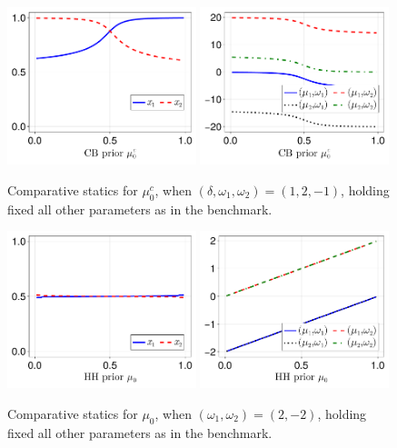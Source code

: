 \documentclass[12pt,a4paper]{article}
\begin{document}
\begin{figure}[H]
\centering
\includegraphics[width=0.49\textwidth]{figures/V8/γ_10/fig_optimal_π_across_μ_0_c_ω_1_2_ω_2_-1_δ_1.0_.pdf}
\includegraphics[width=0.49\textwidth]{figures/V8/γ_10/fig_posterior_across_μ_0_c_ω_1_2_ω_2_-1_δ_1.0_.pdf}
\caption{Comparative statics for $\mu_0^c$, when $(\delta,\omega_1,\omega_2)=(1,2,-1)$, holding fixed all other parameters as in the benchmark.}
\label{FigureA16}
\end{figure}

\begin{figure}[H]
\centering
\includegraphics[width=0.49\textwidth]{figures/V8/γ_1/fig_optimal_π_across_μ_0_ω_1_2_ω_2_-2_δ_0.5_.pdf}
\includegraphics[width=0.49\textwidth]{figures/V8/γ_1/fig_posterior_across_μ_0_ω_1_2_ω_2_-2_δ_0.5_.pdf}
\caption{Comparative statics for $\mu_0$, when $(\omega_1,\omega_2)=(2,-2)$, holding fixed all other parameters as in the benchmark.}
\label{FigureA17}
\end{figure}
\end{document}
